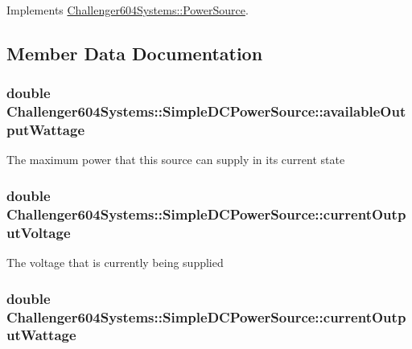 Implements \hyperlink{class_challenger604_systems_1_1_power_source_a005b9cac72b89344aded232d87fde2f6}{Challenger604\-Systems\-::\-Power\-Source}.



\subsection{Member Data Documentation}
\hypertarget{class_challenger604_systems_1_1_simple_d_c_power_source_af174a8c75a7d5e3d07332708802bf658}{
\subsubsection[{available\-Output\-Wattage}]{\setlength{\rightskip}{0pt plus 5cm}double Challenger604\-Systems\-::\-Simple\-D\-C\-Power\-Source\-::available\-Output\-Wattage\hspace{0.3cm}{\ttfamily [protected]}}}\label{class_challenger604_systems_1_1_simple_d_c_power_source_af174a8c75a7d5e3d07332708802bf658}
The maximum power that this source can supply in its current state \hypertarget{class_challenger604_systems_1_1_simple_d_c_power_source_a9f5aa415f92d0a050db0c92fe9f98c1d}{
\subsubsection[{current\-Output\-Voltage}]{\setlength{\rightskip}{0pt plus 5cm}double Challenger604\-Systems\-::\-Simple\-D\-C\-Power\-Source\-::current\-Output\-Voltage\hspace{0.3cm}{\ttfamily [protected]}}}\label{class_challenger604_systems_1_1_simple_d_c_power_source_a9f5aa415f92d0a050db0c92fe9f98c1d}
The voltage that is currently being supplied \hypertarget{class_challenger604_systems_1_1_simple_d_c_power_source_adb91207a44984ac09b34118d3b1157b8}{
\subsubsection[{current\-Output\-Wattage}]{\setlength{\rightskip}{0pt plus 5cm}double Challenger604\-Systems\-::\-Simple\-D\-C\-Power\-Source\-::current\-Output\-Wattage\hspace{0.3cm}{\ttfamily [protected]}}}\label{class_challenger604_systems_1_1_simple_d_c_power_source_adb91207a44984ac09b34118d3b1157b8}
